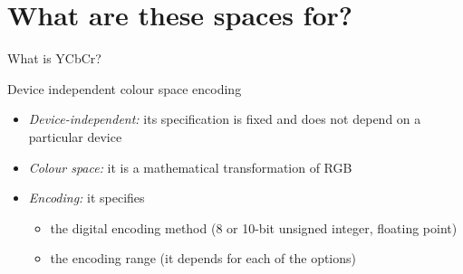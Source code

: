 \documentclass[aspectratio=169,handout]{fireshonks}
\begin{document}
\section{What are these spaces for?}

\begin{frame}{What is YCbCr?}
  \begin{center}
    Device independent colour space encoding
  \end{center}

  \begin{itemize}[<+(1)->]
    \item \emph{Device-independent:} its specification is fixed and does not depend on a particular device
    \item \emph{Colour space:} it is a mathematical transformation of RGB
    \item \emph{Encoding:} it specifies
          \begin{itemize}
            \item the digital encoding method (8 or 10-bit unsigned integer, floating point)
            \item the encoding range (it depends for each of the options)
          \end{itemize}
  \end{itemize}
\end{frame}
\end{document}
